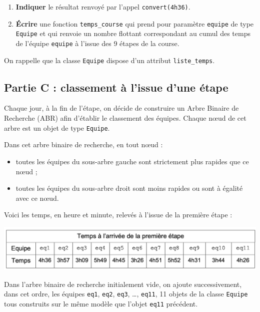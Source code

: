 \begin{enumerate}
\def\labelenumi{\arabic{enumi}.}
\setcounter{enumi}{5}
\tightlist
\item
  \textbf{Indiquer} le résultat renvoyé par l'appel
  \texttt{convert(\textquotesingle{}4h36\textquotesingle{})}.
\item
  \textbf{Écrire} une fonction \texttt{temps\_course} qui prend pour
  paramètre \texttt{equipe} de type \texttt{Equipe} et qui renvoie un
  nombre flottant correspondant au cumul des temps de l'équipe
  \texttt{equipe} à l'issue des 9 étapes de la course.
\end{enumerate}

On rappelle que la classe \texttt{Equipe} dispose d'un attribut
\texttt{liste\_temps}.

\subsection{Partie C : classement à l'issue d'une
étape}\label{partie-c-classement-uxe0-lissue-dune-uxe9tape}

Chaque jour, à la fin de l'étape, on décide de construire un Arbre
Binaire de Recherche (ABR) afin d'établir le classement des équipes.
Chaque nœud de cet arbre est un objet de type \texttt{Equipe}.

Dans cet arbre binaire de recherche, en tout nœud :

\begin{itemize}
\tightlist
\item
  toutes les équipes du sous-arbre gauche sont strictement plus rapides
  que ce nœud ;
\item
  toutes les équipes du sous-arbre droit sont moins rapides ou sont à
  égalité avec ce nœud.
\end{itemize}

Voici les temps, en heure et minute, relevés à l'issue de la première
étape :

\includegraphics{24-NSIJ1ME1-Ex3-02.png}

Dans l'arbre binaire de recherche initialement vide, on ajoute
successivement, dans cet ordre, les équipes \texttt{eq1}, \texttt{eq2},
\texttt{eq3}, \ldots, \texttt{eq11}, 11 objets de la classe
\texttt{Equipe} tous construits sur le même modèle que l'objet
\texttt{eq11} précédent.

